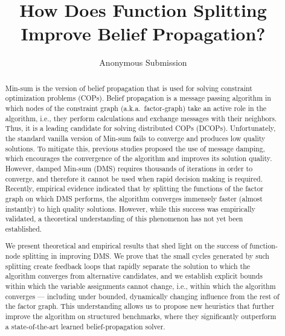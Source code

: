 \documentclass[letterpaper]{article} %
\title{How Does Function Splitting Improve Belief Propagation?}
\author{
    Anonymous Submission
}
\theoremstyle{definition}
\theoremstyle{remark}
\begin{document}
\maketitle
\begin{abstract}
Min-sum is the version of belief propagation that is used for solving constraint optimization problems (COPs). Belief propagation is a message passing algorithm in which nodes of the constraint graph (a.k.a.\ factor-graph) take an active role in the algorithm, i.e., they perform calculations and exchange messages with their neighbors. Thus, it is a leading candidate for solving distributed COPs (DCOPs). Unfortunately, the standard vanilla version of Min-sum fails to converge and produces low quality solutions. To mitigate this, previous studies proposed the use of message damping, which encourages the convergence of the algorithm and improves its solution quality. However, damped Min-sum (DMS) requires thousands of iterations in order to converge, and therefore it cannot be used when rapid decision making is required.
Recently, empirical evidence indicated that by splitting the functions of the factor graph on which DMS performs, the algorithm converges immensely faster (almost instantly) to high quality solutions. However, while this success was empirically validated, a theoretical understanding of this phenomenon has not yet been established.

We present theoretical and empirical results that shed light on the success of function-node splitting in improving DMS. We prove that the small cycles generated by such splitting create feedback loops that rapidly separate the solution to which the algorithm converges from alternative candidates, and we establish explicit bounds within which the variable assignments cannot change, i.e., within which the algorithm converges --- including under bounded, dynamically changing influence from the rest of the factor graph. This understanding allows us to propose new heuristics that further improve the algorithm on structured benchmarks, where they significantly outperform a state-of-the-art learned belief-propagation solver.
\end{abstract}
\begin{links}
\end{links}
\end{document}
